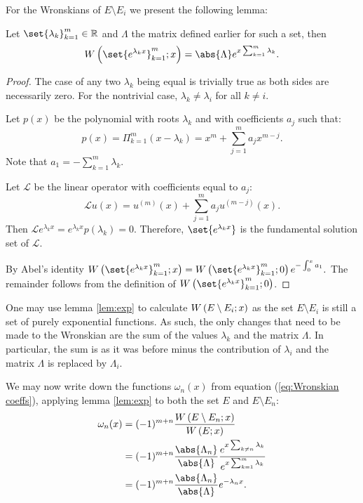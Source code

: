 \documentclass{article}
\begin{document}
For the Wronskians of $E \setminus E_i$ we present the following lemma:

\begin{lemma}
Let $\set{\lambda_k}_{k=1}^m \in \mathbb{R}$ and $\Lambda$ the matrix defined earlier for such a set, then
\begin{equation*}
\W{\set{e^{\lambda_k x}}_{k=1}^m}{x} = \abs{\Lambda}
e^{x \sum_{k=1}^m \lambda_k} .
\end{equation*}
\label{lem:exp}
\end{lemma}

\begin{proof}
The case of any two $\lambda_k$ being equal is trivially true as both sides are necessarily zero.
For the nontrivial case, $\lambda_k \neq \lambda_i$ for all $k \neq i$.

Let $p(x)$ be the polynomial with roots $\lambda_k$ and with coefficients $a_j$ such that:
\begin{equation*}
p(x) = \Pi_{k=1}^m \left (x - \lambda_k \right) = x^m + \sum_{j=1}^m a_j x^{m-j}.
\end{equation*}
Note that $a_1 = -\sum_{k=1}^m \lambda_k$.

Let $\mathcal{L}$ be the linear operator with coefficients equal to $a_j$:
$$
\mathcal{L} u(x) = u^{(m)}(x) + \sum_{j=1}^m a_j u^{(m-j)}(x).
$$
Then $\mathcal{L} e^{\lambda_k x} = e^{\lambda_k x} p(\lambda_k) = 0$.
Therefore, $\set{e^{\lambda_k x}}$ is the fundamental solution set of $\mathcal{L}$.

By Abel's identity $\W{\set{e^{\lambda_k x}}_{k=1}^m}{x} = \W{\set{e^{\lambda_k x}}_{k=1}^m}{0} e^{-\int_0^x a_1}.$
The remainder follows from the definition of $\W{\set{e^{\lambda_k x}}_{k=1}^m}{0}$.
\end{proof}

One may use lemma \ref{lem:exp} to calculate $W \left ( E \setminus E_i ; x \right )$ as the set $E \setminus E_i$ is still a set of purely exponential functions.
As such, the only changes that need to be made to the Wronskian are the sum of the values $\lambda_k$ and the matrix $\Lambda$.
In particular, the sum is as it was before minus the contribution of $\lambda_i$ and the matrix $\Lambda$ is replaced by $\Lambda_i$.

We may now write down the functions $\omega_n(x)$ from equation (\ref{eq:Wronskian coeffs}), applying lemma \ref{lem:exp} to both the set $E$ and $E \setminus E_n$:
\begin{equation*}
\begin{split}
\omega_n(x) & = (-1)^{m+n} \frac{\W{E \setminus E_n}{x}}{\W{E}{x}} \\
			& = (-1)^{m+n} \frac{\abs{\Lambda_n}}{\abs{\Lambda}} \frac{e^{x \sum_{k \neq n} \lambda_k}}{e^{x \sum_{k=1}^m \lambda_k}} \\
			& = (-1)^{m+n} \frac{\abs{\Lambda_n}}{\abs{\Lambda}} e^{-\lambda_n x} .
\end{split}
\end{equation*}
\end{document}

